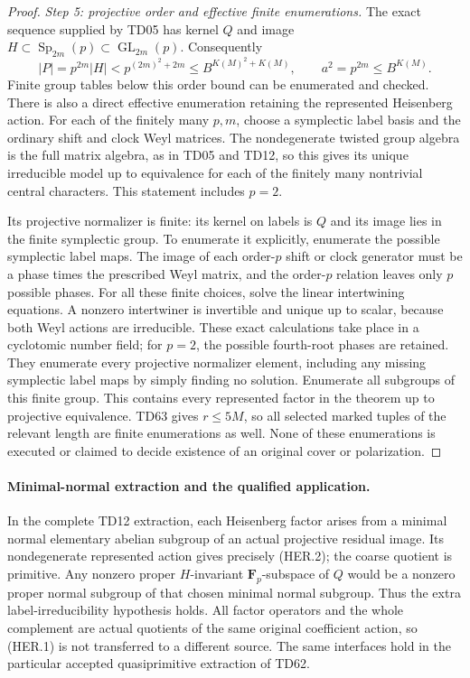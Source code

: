 \begin{proof}
\emph{Step 5: projective order and effective finite enumerations.}
The exact sequence supplied by TD05 has kernel \(Q\) and image
\(H\subset\operatorname{Sp}_{2m}(p)\subset\operatorname{GL}_{2m}(p)\).
Consequently
\[
 |P|=p^{2m}|H|
       <p^{(2m)^2+2m}\le B^{K(M)^2+K(M)},
 \qquad a^2=p^{2m}\le B^{K(M)}.
 \tag{HER.20}
\]
Finite group tables below this order bound can be enumerated and
checked.  There is also a direct effective enumeration retaining the
represented Heisenberg action.  For each of the finitely many \(p,m\),
choose a symplectic label basis and the ordinary shift and clock
Weyl matrices.  The nondegenerate twisted group algebra is the full
matrix algebra, as in TD05 and TD12, so this gives its unique
irreducible model up to equivalence for each of the finitely many
nontrivial central characters.  This statement includes \(p=2\).

Its projective normalizer is finite: its kernel on labels is \(Q\)
and its image lies in the finite symplectic group.  To enumerate it
explicitly, enumerate the possible symplectic label maps.  The image
of each order-\(p\) shift or clock generator must be a phase times
the prescribed Weyl matrix, and the order-\(p\) relation leaves only
\(p\) possible phases.  For all these finite choices, solve the
linear intertwining equations.  A nonzero intertwiner is invertible
and unique up to scalar, because both Weyl actions are irreducible.
These exact calculations take place in a cyclotomic number field;
for \(p=2\), the possible fourth-root phases are retained.  They
enumerate every projective normalizer element, including any missing
symplectic label maps by simply finding no solution.  Enumerate all
subgroups of this finite group.  This contains every represented
factor in the theorem up to projective equivalence.  TD63 gives
\(r\le5M\), so all selected marked tuples of the relevant length are
finite enumerations as well.  None of these enumerations is executed
or claimed to decide existence of an original cover or polarization.
\end{proof}

\paragraph{Minimal-normal extraction and the qualified application.}
In the complete TD12 extraction, each Heisenberg factor arises from
a minimal normal elementary abelian subgroup of an actual projective
residual image.  Its nondegenerate represented action gives precisely
(HER.2); the coarse quotient is primitive.  Any nonzero proper
\(H\)-invariant \(\mathbf F_p\)-subspace of \(Q\) would be a nonzero
proper normal subgroup of that chosen minimal normal subgroup.
Thus the extra label-irreducibility hypothesis holds.  All factor
operators and the whole complement are actual quotients of the same
original coefficient action, so (HER.1) is not transferred to a
different source.  The same interfaces hold in the particular accepted
quasiprimitive extraction of TD62.

